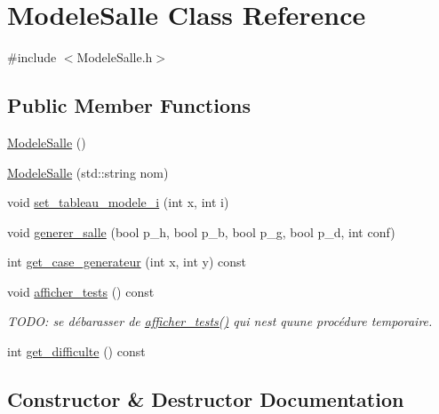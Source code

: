 \hypertarget{classModeleSalle}{}\section{Modele\+Salle Class Reference}
\label{classModeleSalle}


{\ttfamily \#include $<$Modele\+Salle.\+h$>$}

\subsection*{Public Member Functions}
\begin{DoxyCompactItemize}
\item 
\hyperlink{classModeleSalle_a3862e1a603ae1e289fe786a272d373c7}{Modele\+Salle} ()
\item 
\hyperlink{classModeleSalle_ae0e4e76bbf2dd64b14fd4742322fac24}{Modele\+Salle} (std\+::string nom)
\item 
void \hyperlink{classModeleSalle_a32536fadf3b9aac1238b9dfb2d614e0a}{set\+\_\+tableau\+\_\+modele\+\_\+i} (int x, int i)
\item 
void \hyperlink{classModeleSalle_a7f53bbe715e9d145dcb7da65f09099a8}{generer\+\_\+salle} (bool p\+\_\+h, bool p\+\_\+b, bool p\+\_\+g, bool p\+\_\+d, int conf)
\item 
int \hyperlink{classModeleSalle_adff644b8a3ec357d7cd3cd31654cf18a}{get\+\_\+case\+\_\+generateur} (int x, int y) const 
\item 
void \hyperlink{classModeleSalle_aeaae0d47f7a3bb6c0ccd52cb12b0c652}{afficher\+\_\+tests} () const 
\begin{DoxyCompactList}\small\item\em T\+O\+DO\+: se débarasser de \hyperlink{classModeleSalle_aeaae0d47f7a3bb6c0ccd52cb12b0c652}{afficher\+\_\+tests()} qui n\textquotesingle{}est qu\textquotesingle{}une procédure temporaire. \end{DoxyCompactList}\item 
int \hyperlink{classModeleSalle_a87a4cfb3c84776902d159486ef7c4a1a}{get\+\_\+difficulte} () const 
\end{DoxyCompactItemize}


\subsection{Constructor \& Destructor Documentation}
